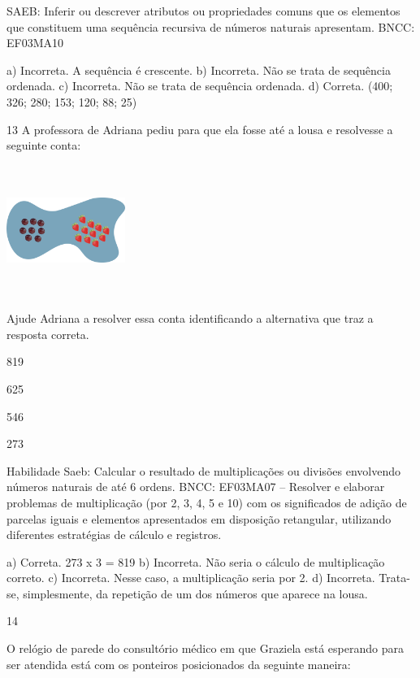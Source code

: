 \begin{escolha}
{\begin{escolha}
{SAEB: Inferir ou descrever atributos ou propriedades comuns
que os elementos que constituem uma sequência recursiva de números
naturais apresentam.
BNCC: EF03MA10

a) Incorreta. A sequência é crescente.
b) Incorreta. Não se trata de sequência ordenada.
c) Incorreta. Não se trata de sequência ordenada.
d) Correta. (400; 326; 280; 153; 120; 88; 25)

\num{13} A professora de Adriana pediu para que ela fosse até a lousa e resolvesse a seguinte conta:


\includegraphics[width=1.51680in,height=1.67515in]{media/image114.png}

Ajude Adriana a resolver essa conta identificando a alternativa que traz a resposta correta.

\begin{escolha}
\item
  819
\item
  625
\item
  546
\item
  273
\end{escolha}

Habilidade Saeb: Calcular o resultado de multiplicações ou divisões
envolvendo números naturais de até 6 ordens.
BNCC: EF03MA07 – Resolver e elaborar problemas de multiplicação (por 2, 3, 4, 5 e 10) com os
significados de adição de parcelas iguais e elementos apresentados em disposição retangular,
utilizando diferentes estratégias de cálculo e registros.


a) Correta. 273 x 3 = 819
b) Incorreta. Não seria o cálculo de multiplicação correto.
c) Incorreta. Nesse caso, a multiplicação seria por 2.
d) Incorreta. Trata-se, simplesmente, da repetição de um dos números que aparece na lousa.

\num{14}

O relógio de parede do consultório médico em que Graziela está esperando
para ser atendida está com os ponteiros posicionados da seguinte maneira:

}
\end{escolha}}
\end{escolha}
